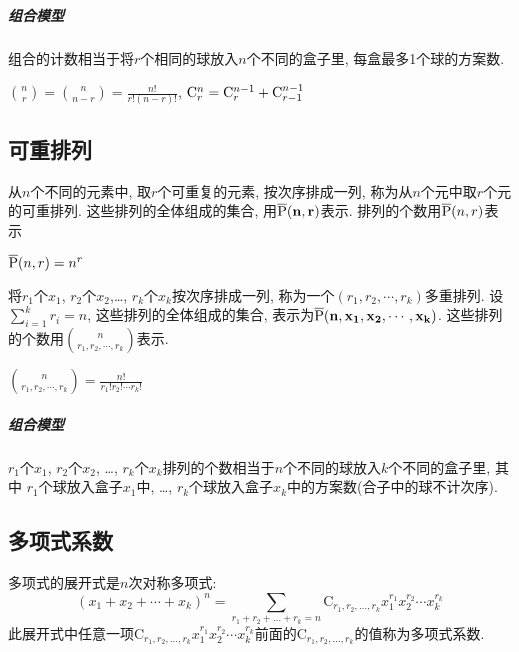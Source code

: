         \subparagraph{组合模型}

            组合的计数相当于将$r$个相同的球放入$n$个不同的盒子里, 每盒最多1个球的方案数.

        \begin{prop}
            ${n\choose r}={n\choose n-r}=\frac{n!}{r!(n-r)!}$, $\C^n_r=\C^{n-1}_r+\C^{n-1}_{r-1}$
        \end{prop}

    \subsection{可重排列}

        \begin{definition}[可重排列]
            从$n$个不同的元素中, 取$r$个可重复的元素, 按次序排成一列, 称为从$n$个元中取$r$个元的\textsf{可重排列}. 这些排列的全体组成的集合, 用$\mathbf{\overline{\P}(n,r)}$表示.  排列的个数用$\overline{\P}(n,r)$表示
        \end{definition}

        \begin{theorem}
            $\overline{\P}(n,r)=n^r$
        \end{theorem}

        \begin{definition}[多重排列]
            将$r_1$个$x_1$, $r_2$个$x_2$,\ldots, $r_k$个$x_k$按次序排成一列, 称为一个$(r_1,r_2,\cdots,r_k)$\textsf{多重排列}. 设$\sum_{i=1}^kr_i=n$, 这些排列的全体组成的集合, 表示为$\mathbf{\overline \P(n,x_1,x_2,\cdots,x_k)}$. 这些排列的个数用$n\choose{r_1,r_2,\cdots,r_k}$表示. 
        \end{definition}

        \begin{theorem}
            ${n\choose{r_1,r_2,\cdots,r_k}}=\frac{n!}{r_1!r_2!\cdots r_k!}$
        \end{theorem}

        \subparagraph{组合模型}

            $r_1$个$x_1$, $r_2$个$x_2$, \ldots, $r_k$个$x_k$排列的个数相当于$n$个不同的球放入$k$个不同的盒子里, 其中 $r_1$个球放入盒子$x_1$中, \ldots, $r_k$个球放入盒子$x_k$中的方案数(合子中的球不计次序). 

    \subsection{多项式系数}

        \begin{definition}[多项式系数]
            多项式的展开式是$n$次对称多项式:
            \[(x_1+x_2+\cdots+x_k)^n=\sum_{r_1+r_2+\ldots+r_k=n}\mathrm{C}_{r_1,r_2,\ldots,r_k}x_1^{r_1}x_2^{r_2}\cdots x_k^{r_k}\]
            此展开式中任意一项$\mathrm{C}_{r_1,r_2,\ldots,r_k}x_1^{r_1}x_2^{r_2}\cdots x_k^{r_k}$前面的$\mathrm{C}_{r_1,r_2,\ldots,r_k}$的值称为\textsf{多项式系数}.
        \end{definition}


